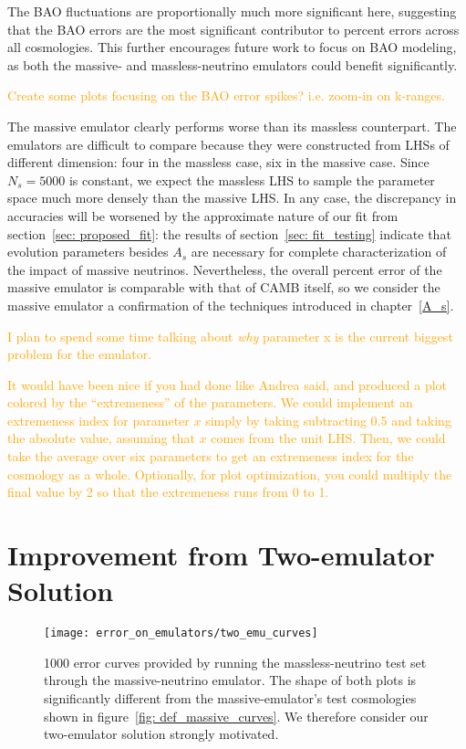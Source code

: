 The BAO fluctuations are proportionally much more significant here, suggesting
that the BAO errors are the most significant contributor to percent errors
across all cosmologies. This
further encourages future work to focus on BAO modeling, as both the massive-
and massless-neutrino emulators could benefit significantly.

\textcolor{orange}{Create some plots focusing on the BAO error spikes? i.e.
zoom-in on k-ranges.}

The massive emulator clearly performs worse than its 
massless counterpart. The emulators are difficult to compare because they
were constructed from LHSs of different dimension: four in the massless case,
six in the massive case. Since $N_s = 5000$ is constant, we expect the 
massless LHS to sample the parameter space much more densely than the massive
LHS. In any case, the discrepancy in accuracies will be worsened by the
approximate nature of our fit from section~\ref{sec: proposed_fit}:
the results of section~\ref{sec: fit_testing} indicate
that evolution parameters besides $A_s$ are necessary for complete
characterization of the impact of massive neutrinos. Nevertheless, the
overall percent error of the massive emulator is comparable with that
of CAMB itself, so we consider the massive emulator a confirmation of the
techniques introduced in chapter~\ref{A_s}.

\textcolor{orange}{I plan to spend some time talking 
about \textit{why} parameter x is the current biggest problem for the 
emulator.}

\textcolor{orange}{It would have been nice if you had done like Andrea said,
and produced a plot colored by the ``extremeness'' of the parameters. We
could implement an extremeness index for parameter $x$ simply by taking
subtracting 0.5 and taking the absolute value, assuming that $x$ comes from
the unit LHS. Then, we could take the average over six parameters to get
an extremeness index for the cosmology as a whole. Optionally, for plot
optimization, you could multiply the final value by 2 so that the extremeness
runs from 0 to 1.}


\section{Improvement from Two-emulator Solution}
\label{sec: 2emu_improvement}

\begin{figure}[ht!]
  \centering
  \texttt{[image: error\_on\_emulators/two\_emu\_curves]}
  \caption[Performance of Massive Emulator in Massless Case]{1000 error
  	curves provided
  	by running the massless-neutrino test set through the massive-neutrino 
  	emulator. The shape of both plots is significantly different from the
  	massive-emulator's test cosmologies shown in
  	figure~\ref{fig: def_massive_curves}. We therefore consider our
  	two-emulator solution strongly motivated.}
  \label{fig: two_emu_curves}
\end{figure}

